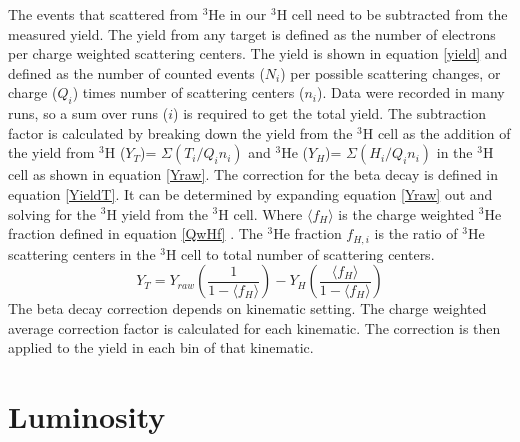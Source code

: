 The events that scattered from $^3$He in our $^3$H cell need to be subtracted from the measured yield. The yield from any target is defined as the number of electrons per charge weighted scattering centers. The yield is shown in equation \ref{yield} and defined as the number of counted events ($N_i$) per possible scattering changes, or charge ($Q_i$) times number of scattering centers ($n_i$). Data were recorded in many runs, so a sum over runs ($i$) is required to get the total yield. The subtraction factor is calculated by breaking down the yield from the $^3$H cell as the addition of the yield from $^3$H ($Y_T$)= $\Sigma(T_i/Q_in_{i})$ and $^3$He ($Y_H$)= $\Sigma(H_i/Q_in_{i})$ in the $^3$H cell as shown in equation \ref{Yraw}. The correction for the beta decay is defined in equation \ref{YieldT}. It can be determined by expanding equation \ref{Yraw} out and solving for the $^3$H yield from the $^3$H cell. Where $\langle f_H \rangle$ is the charge weighted $^3$He fraction defined in equation \ref{QwHf} \cite{primer}. The $^3$He fraction $f_{H,i}$ is the ratio of $^3$He scattering centers in the $^3$H cell to total number of scattering centers. 
\begin{equation}
Y_T = Y_{raw}\left(\frac{1}{1-\langle f_H \rangle}\right) - Y_H \left(\frac{\langle f_H \rangle}{1-\langle f_H \rangle}\right) \label{YieldT}
\end{equation}
The beta decay correction depends on kinematic setting. The charge weighted average correction factor is calculated for each kinematic. The correction is then applied to the yield in each bin of that kinematic. 


\section{Luminosity}
